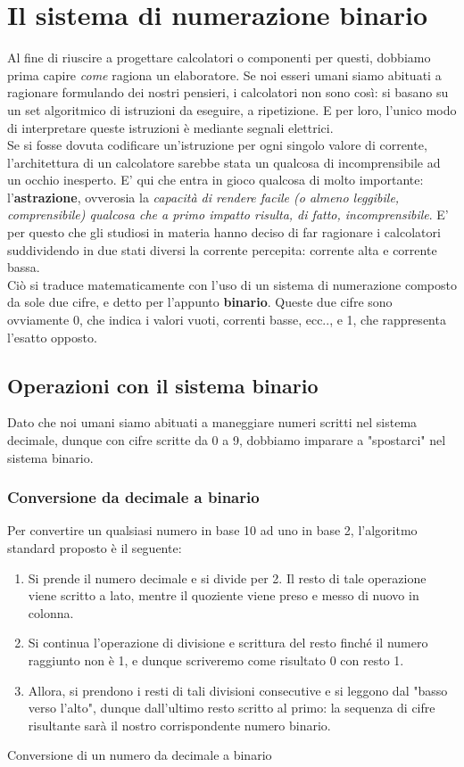 \documentclass[12pt]{report}
\begin{document}
	
	
	\chapter{Il sistema di numerazione binario}
	Al fine di riuscire a progettare calcolatori o componenti per questi, dobbiamo prima capire \textit{come} ragiona un elaboratore.
	Se noi esseri umani siamo abituati a ragionare formulando dei nostri pensieri, i calcolatori non sono così: si basano su un set algoritmico di istruzioni da eseguire, a ripetizione. E per loro, l'unico modo di interpretare queste istruzioni è mediante segnali elettrici.\\
	Se si fosse dovuta codificare un'istruzione per ogni singolo valore di corrente, l'architettura di un calcolatore sarebbe stata un qualcosa di incomprensibile ad un occhio inesperto. E' qui che entra in gioco qualcosa di molto importante: l'\textbf{astrazione}, ovverosia la \textit{capacità di rendere facile (o almeno leggibile, comprensibile) qualcosa che a primo impatto risulta, di fatto, incomprensibile}. E' per questo che gli studiosi in materia hanno deciso di far ragionare i calcolatori suddividendo in due stati diversi la corrente percepita: corrente alta e corrente bassa.\\
	Ciò si traduce matematicamente con l'uso di un sistema di numerazione composto da sole due cifre, e detto per l'appunto \textbf{binario}. Queste due cifre sono ovviamente 0, che indica i valori vuoti, correnti basse, ecc.., e 1, che rappresenta l'esatto opposto.
	
	\section{Operazioni con il sistema binario}
	Dato che noi umani siamo abituati a maneggiare numeri scritti nel sistema decimale, dunque con cifre scritte da 0 a 9, dobbiamo imparare a "spostarci" nel sistema binario.
	
	\subsection{Conversione da decimale a binario}
	Per convertire un qualsiasi numero in base 10 ad uno in base 2, l'algoritmo standard proposto è il seguente:
	\begin{enumerate}
		\item Si prende il numero decimale e si divide per 2. Il resto di tale operazione viene scritto a lato, mentre il quoziente viene preso e messo di nuovo in colonna.
		
		\item Si continua l'operazione di divisione e scrittura del resto finché il numero raggiunto non è 1, e dunque scriveremo come risultato 0 con resto 1.
		
		\item Allora, si prendono i resti di tali divisioni consecutive e si leggono dal "basso verso l'alto", dunque dall'ultimo resto scritto al primo: la sequenza di cifre risultante sarà il nostro corrispondente numero binario.
	\end{enumerate}
	
	\begin{esempio}{Conversione di un numero da decimale a binario}{}
		
	\end{esempio}
	
\end{document}

